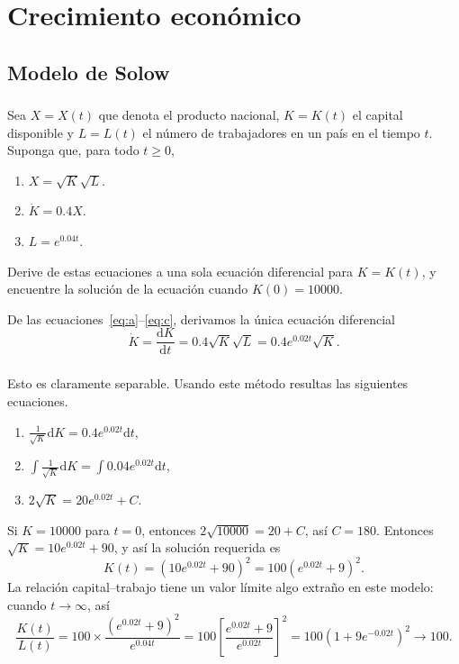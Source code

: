 \section{Crecimiento económico}

\subsection{Modelo de Solow}

\begin{frame}[t]
\frametitle{\subsecname}

\begin{example}
Sea $X=X\left(t\right)$ que denota el producto nacional, $K=K\left(t\right)$ el capital disponible y $L=L\left(t\right)$ el número de trabajadores en un país en el tiempo $t$. Suponga que, para todo $t\geq0$,
\begin{multicols}{3}
	\begin{enumerate}
		\item $X=\sqrt{K}\sqrt{L}$.\label{eq:a}
		\item $\dot{K}=0.4X$.\label{eq:b}
		\item $L=e^{0.04t}$.\label{eq:c}
	\end{enumerate}
\end{multicols}
Derive de estas ecuaciones a una sola ecuación diferencial para $K=K\left(t\right)$, y encuentre la solución de la ecuación cuando $K\left(0\right)=10000$.
\end{example}
\begin{solutions}
De las ecuaciones~\ref{eq:a}--\ref{eq:c}, derivamos la única ecuación diferencial \[ \dot{K}=\frac{\mathrm{d}K}{\mathrm{d}t}=0.4\sqrt{K}\sqrt{L}=0.4e^{0.02t}\sqrt{K}. \]
\end{solutions}
\end{frame}

\begin{frame}
\frametitle{\subsecname}
\begin{solutions}
Esto es claramente separable. Usando este método resultas las siguientes ecuaciones.
\begin{multicols}{3}
\begin{enumerate}
	\item $\frac{1}{\sqrt{K}}\mathrm{d}K=0.4e^{0.02t}\mathrm{d}t$,
	\item $\int\frac{1}{\sqrt{K}}\mathrm{d}K=\int0.04e^{0.02t}\mathrm{d}t$,
	\item $2\sqrt{K}=20e^{0.02t}+C$.
\end{enumerate}
\end{multicols}
Si $K=10000$ para $t=0$, entonces $2\sqrt{10000}=20+C$, así $C=180$. Entonces $\sqrt{K}=10e^{0.02t}+90$, y así la solución requerida es \[ K\left(t\right)=\left(10e^{0.02t}+90\right)^{2}=100\left(e^{0.02t}+9\right)^{2}. \] La relación capital--trabajo tiene un valor límite algo extraño en este modelo: cuando $t\to\infty$, así \[ \frac{K\left(t\right)}{L\left(t\right)}=100\times\frac{{\left(e^{0.02t}+9\right)}^{2}}{e^{0.04t}}=100{\left[\frac{e^{0.02t}+9}{e^{0.02t}}\right]}^{2}=100\left(1+9e^{-0.02t}\right)^{2}\rightarrow100. \]
\end{solutions}
\end{frame}

